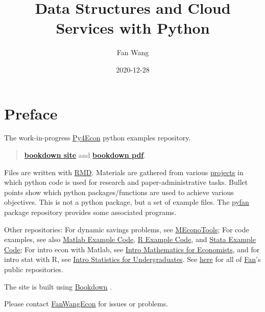 \documentclass[
]{book}
\title{Data Structures and Cloud Services with Python}
\author{Fan Wang}
\date{2020-12-28}
\begin{document}
\maketitle

{
\hypersetup{linkcolor=}
\setcounter{tocdepth}{2}
\tableofcontents
}
\hypertarget{preface}{%
\chapter*{Preface}\label{preface}}

The work-in-progress \href{https://github.com/FanWangEcon/Py4Econ}{Py4Econ} python examples repository.

\begin{quote}
\href{https://fanwangecon.github.io/Py4Econ/bookdown}{\textbf{bookdown site}} and \href{https://fanwangecon.github.io/Py4Econ/bookdown/Data-Structures-and-Cloud-Services-with-Python.pdf}{\textbf{bookdown pdf}}.
\end{quote}

Files are written with \href{https://rmarkdown.rstudio.com/}{RMD}. Materials are gathered from various \href{https://fanwangecon.github.io/research}{projects} in which python code is used for research and paper-administrative tasks. Bullet points show which python packages/functions are used to achieve various objectives. This is not a python package, but a set of example files. The \href{https://pyfan.readthedocs.io/en/latest/}{pyfan} package repository provides some associated programs.

Other repositories: For dynamic savings problems, see \href{https://fanwangecon.github.io/MEconTools/}{MEconoTools}; For code examples, see also \href{https://fanwangecon.github.io/M4Econ/}{Matlab Example Code}, \href{https://fanwangecon.github.io/R4Econ/}{R Example Code}, and \href{https://fanwangecon.github.io/Stata4Econ/}{Stata Example Code}; For intro econ with Matlab, see \href{https://fanwangecon.github.io/Math4Econ/}{Intro Mathematics for Economists}, and for intro stat with R, see \href{https://fanwangecon.github.io/Stat4Econ/}{Intro Statistics for Undergraduates}. See \href{https://github.com/FanWangEcon}{here} for all of \href{https://fanwangecon.github.io/}{Fan}'s public repositories.

The site is built using \href{https://bookdown.org/}{Bookdown} \citep{R-bookdown}.

Please contact \href{https://fanwangecon.github.io/}{FanWangEcon} for issues or problems.
\end{document}
